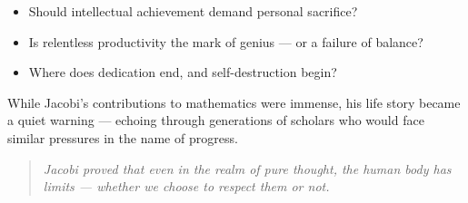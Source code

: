 \begin{tcolorbox}[colback=gray!5!white, colframe=gray!50!black, title={Historical Sidebar: Jacobi and the Perils of Mathematical Martyrdom}, breakable]
    \begin{itemize}
      \item Should intellectual achievement demand personal sacrifice?
      \item Is relentless productivity the mark of genius — or a failure of balance?
      \item Where does dedication end, and self-destruction begin?
    \end{itemize}
    
    \medskip
    
    While Jacobi’s contributions to mathematics were immense, his life story became a quiet warning — echoing through generations of scholars who would face similar pressures in the name of progress.
    
    \begin{quote}
    \textit{Jacobi proved that even in the realm of pure thought,  
    the human body has limits — whether we choose to respect them or not.}
    \end{quote}
    
\end{tcolorbox}

